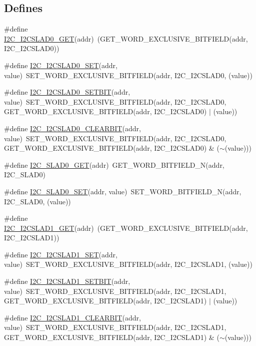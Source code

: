 \subsection*{Defines}
\begin{DoxyCompactItemize}
\item 
\#define \hyperlink{a00557_a678cf4a9a6e98a9964d048ea219f7c8d}{I2C\_\-I2CSLAD0\_\-GET}(addr)~(GET\_\-WORD\_\-EXCLUSIVE\_\-BITFIELD(addr, I2C\_\-I2CSLAD0))
\item 
\#define \hyperlink{a00557_a1a05ea903a1388421250fb9c8e4fcd00}{I2C\_\-I2CSLAD0\_\-SET}(addr, value)~SET\_\-WORD\_\-EXCLUSIVE\_\-BITFIELD(addr, I2C\_\-I2CSLAD0, (value))
\item 
\#define \hyperlink{a00557_af7b059d9b09b72d944ad47c64cf675b1}{I2C\_\-I2CSLAD0\_\-SETBIT}(addr, value)~SET\_\-WORD\_\-EXCLUSIVE\_\-BITFIELD(addr, I2C\_\-I2CSLAD0, GET\_\-WORD\_\-EXCLUSIVE\_\-BITFIELD(addr, I2C\_\-I2CSLAD0) $|$ (value))
\item 
\#define \hyperlink{a00557_a980d4fb5a97e37a67ca0818730a1cdbb}{I2C\_\-I2CSLAD0\_\-CLEARBIT}(addr, value)~SET\_\-WORD\_\-EXCLUSIVE\_\-BITFIELD(addr, I2C\_\-I2CSLAD0, GET\_\-WORD\_\-EXCLUSIVE\_\-BITFIELD(addr, I2C\_\-I2CSLAD0) \& ($\sim$(value)))
\item 
\#define \hyperlink{a00557_aecdf7c72858cee7fda3e1e110af2d570}{I2C\_\-SLAD0\_\-GET}(addr)~GET\_\-WORD\_\-BITFIELD\_\-N(addr, I2C\_\-SLAD0)
\item 
\#define \hyperlink{a00557_a51c1f2368f2f33bd18d0e4f31c45edfb}{I2C\_\-SLAD0\_\-SET}(addr, value)~SET\_\-WORD\_\-BITFIELD\_\-N(addr, I2C\_\-SLAD0, (value))
\item 
\#define \hyperlink{a00557_a59b592bcf65ca5c6e8a03032cb6ab6e2}{I2C\_\-I2CSLAD1\_\-GET}(addr)~(GET\_\-WORD\_\-EXCLUSIVE\_\-BITFIELD(addr, I2C\_\-I2CSLAD1))
\item 
\#define \hyperlink{a00557_a1860ff0daa3ac5fbb6ce5f326b1936c6}{I2C\_\-I2CSLAD1\_\-SET}(addr, value)~SET\_\-WORD\_\-EXCLUSIVE\_\-BITFIELD(addr, I2C\_\-I2CSLAD1, (value))
\item 
\#define \hyperlink{a00557_a3fdd2abbeb3157e401984092ee6e0dd3}{I2C\_\-I2CSLAD1\_\-SETBIT}(addr, value)~SET\_\-WORD\_\-EXCLUSIVE\_\-BITFIELD(addr, I2C\_\-I2CSLAD1, GET\_\-WORD\_\-EXCLUSIVE\_\-BITFIELD(addr, I2C\_\-I2CSLAD1) $|$ (value))
\item 
\#define \hyperlink{a00557_a6f3c9e7b4353987b8353cff7e573acfb}{I2C\_\-I2CSLAD1\_\-CLEARBIT}(addr, value)~SET\_\-WORD\_\-EXCLUSIVE\_\-BITFIELD(addr, I2C\_\-I2CSLAD1, GET\_\-WORD\_\-EXCLUSIVE\_\-BITFIELD(addr, I2C\_\-I2CSLAD1) \& ($\sim$(value)))

\end{DoxyCompactItemize}

